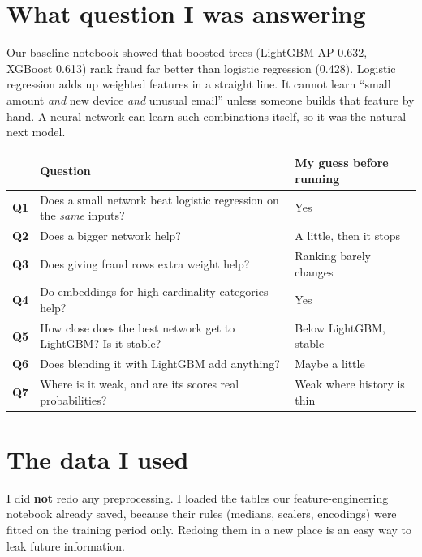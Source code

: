 \documentclass[11pt]{article}
\begin{document}
\section{What question I was answering}
Our baseline notebook showed that boosted trees (LightGBM AP 0.632, XGBoost 0.613) rank fraud far better than logistic regression (0.428). Logistic regression adds up weighted features in a straight line. It cannot learn ``small amount \emph{and} new device \emph{and} unusual email'' unless someone builds that feature by hand. A neural network can learn such combinations itself, so it was the natural next model.

\begin{center}
\begin{tabularx}{\linewidth}{@{}>{\raggedright\arraybackslash\bfseries}p{0.7cm}L>{\raggedright\arraybackslash}p{5.3cm}@{}}
\toprule
& \textbf{Question} & \textbf{My guess before running} \\
\midrule
Q1 & Does a small network beat logistic regression on the \emph{same} inputs? & Yes \\
Q2 & Does a bigger network help? & A little, then it stops \\
Q3 & Does giving fraud rows extra weight help? & Ranking barely changes \\
Q4 & Do embeddings for high-cardinality categories help? & Yes \\
Q5 & How close does the best network get to LightGBM? Is it stable? & Below LightGBM, stable \\
Q6 & Does blending it with LightGBM add anything? & Maybe a little \\
Q7 & Where is it weak, and are its scores real probabilities? & Weak where history is thin \\
\bottomrule
\end{tabularx}
\end{center}

\section{The data I used}
I did \textbf{not} redo any preprocessing. I loaded the tables our feature-engineering notebook already saved, because their rules (medians, scalers, encodings) were fitted on the training period only. Redoing them in a new place is an easy way to leak future information.
\end{document}

